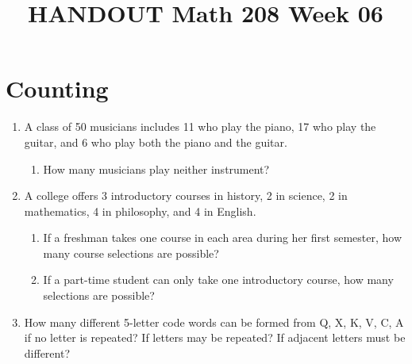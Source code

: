 \documentclass[14pt]{extarticle}
\title{\vspace{-5ex}HANDOUT Math 208 Week 06}
\date{\vspace{-10ex}}
\begin{document}
\maketitle	
{}	
\section{Counting}
\begin{enumerate}
	\item A class of 50 musicians includes 11 who play the piano, 17 who play the guitar, and 6 who play both the piano and the guitar.
	\begin{enumerate}
		\item How many musicians play neither instrument?
		\vspace{2.2cm}
	\end{enumerate}

	\item A college offers 3 introductory courses in history, 2 in science, 2 in mathematics, 4 in philosophy, and 4 in English.
	\begin{enumerate}
		\item If a freshman takes one course in each area during her first semester, how many course selections are possible?
		\vspace{2.2cm}
		\item If a part-time student can only take one introductory course, how many selections are possible?
		\vspace{2.2cm}
	\end{enumerate}
	\item How many different 5-letter code words can be formed from Q, X, K, V, C, A if no letter is repeated? If letters may be repeated? If adjacent letters must be different?


\cleardoublepage

\end{enumerate}
\end{document}
